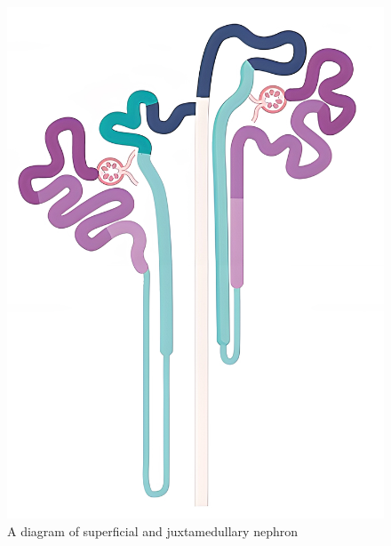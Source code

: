 \documentclass[
11pt,notheorems,hyperref={pdfauthor=whatever}
]{beamer}
\begin{document}
\begin{frame}
\begin{columns}[T,onlytextwidth]
        \begin{figure}[h]
            \renewcommand{\figurename}{Figure 1}
            \includegraphics [scale=0.045] {AldoFruc_Nephron.jpg} 
            \caption{A diagram of superficial and juxtamedullary nephron \cite{schnell2022nephron}}
        \end{figure}
    \end{columns}
\end{frame}
\end{document}
